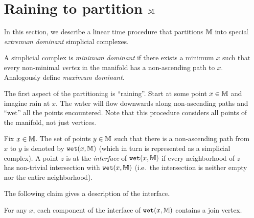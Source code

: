 \section{Raining to partition $\mathbb{M}$} \label{sec:rain}

In this section, we describe a linear time procedure that partitions $\mathbb{M}$ into special
\emph{extremum dominant} simplicial complexes.

\begin{definition} \label{def:dom} A simplicial complex is \emph{minimum dominant} if there exists
a minimum $x$ such that every non-minimal \emph{vertex} in the manifold has a non-ascending path to $x$.
Analogously define \emph{maximum dominant}. 
\end{definition}

The first aspect of the partitioning is ``raining''. Start at some point $x \in \mathbb{M}$ and imagine rain at $x$.
The water will flow downwards along non-ascending paths and ``wet'' all the points encountered. Note that this procedure considers all points
of the manifold, not just vertices.

\begin{definition} \label{def:wet} Fix $x \in \mathbb{M}$. The set of points $y \in \mathbb{M}$ such that there is a non-ascending path from $x$ to $y$
is denoted by ${\tt wet}(x,\mathbb{M})$ (which in turn is represented as a simplicial complex). A point $z$ is at the \emph{interface} of ${\tt wet}(x,\mathbb{M})$ if every neighborhood of $z$
has non-trivial intersection with ${\tt wet}(x,\mathbb{M})$ (i.e.\ the intersection is neither empty nor the entire neighborhood).
\end{definition}

The following claim gives a description of the interface. 

\begin{claim} \label{clm:inter} For any $x$, each component of the interface of ${\tt wet}(x,\mathbb{M})$ contains a join vertex.
\end{claim}

